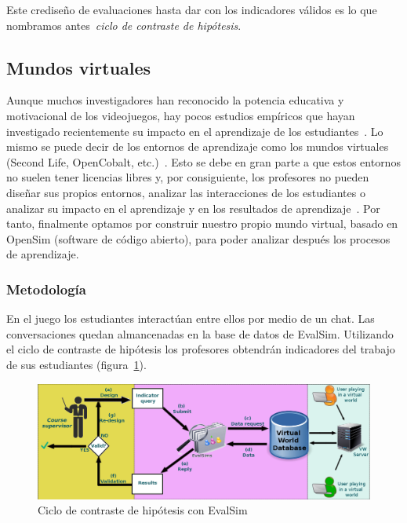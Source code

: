 Este crediseño de evaluaciones hasta dar con los indicadores válidos es lo que nombramos antes~\emph{ciclo de contraste de hipótesis}.

\subsection{Mundos virtuales}

Aunque muchos investigadores han reconocido la potencia educativa y motivacional de los videojuegos, hay pocos estudios empíricos que hayan investigado recientemente su impacto en el aprendizaje de los estudiantes~\cite{berns2013game}. Lo mismo se puede decir de los entornos de aprendizaje como los mundos virtuales (Second Life, OpenCobalt, etc.)~\cite{hew2010use}. Esto se debe en gran parte a que estos entornos no suelen tener licencias libres y, por consiguiente, los profesores no pueden diseñar sus propios entornos, analizar las interacciones de los estudiantes o analizar su impacto en el aprendizaje y en los resultados de aprendizaje~\cite{cruz2015discovering,moreno2014serious}. Por tanto, finalmente optamos por construir nuestro propio mundo virtual, basado en OpenSim (software de código abierto), para poder analizar después los procesos de aprendizaje.

\subsubsection{Metodología}

En el juego los estudiantes interactúan entre ellos por medio de un chat. Las conversaciones quedan almancenadas en la base de datos de EvalSim. Utilizando el ciclo de contraste de hipótesis los profesores obtendrán indicadores del trabajo de sus estudiantes (figura~\ref{fig:EvalSimArchitecture}).

\begin{figure}
  \begin{center}
    \includegraphics[scale=0.29]{EvalSimArchitecture.png}
  \end{center}
  \caption{Ciclo de contraste de hipótesis con EvalSim}
  \label{fig:EvalSimArchitecture}
\end{figure}

